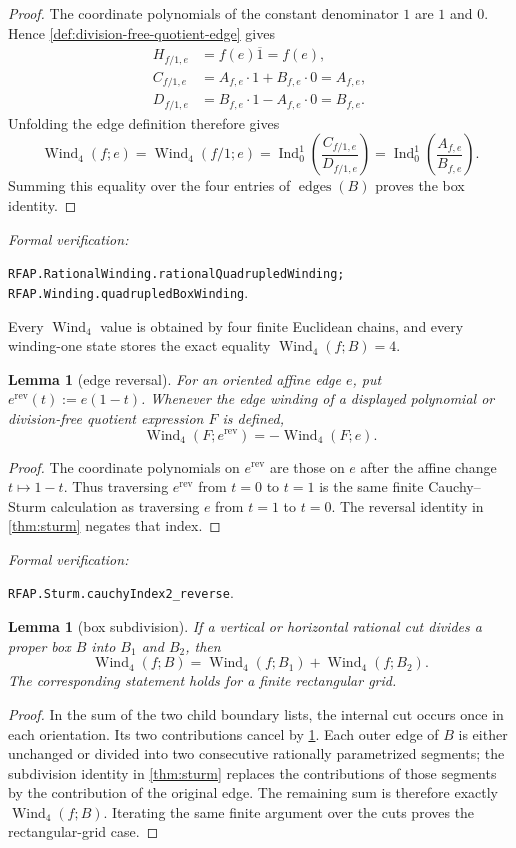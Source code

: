 \documentclass[11pt]{article}
\newtheorem{lemma}[theorem]{Lemma}
\newcommand{\Wind}{\operatorname{Wind}}
\newcommand{\Ind}{\operatorname{Ind}}
\newcommand{\leanref}[1]{\par\smallskip\noindent
  \emph{Formal verification:}\par\nobreak
  {\raggedright\nolinkurl{#1}.\par}}
\begin{document}
\begin{proof}
The coordinate polynomials of the constant denominator $1$ are $1$ and
$0$.  Hence \cref{def:division-free-quotient-edge} gives
\[
 \begin{aligned}
 H_{f/1,e}
   &=f(e)\overline{1}=f(e),\\
 C_{f/1,e}
   &=A_{f,e}\cdot1+B_{f,e}\cdot0=A_{f,e},\\
 D_{f/1,e}
   &=B_{f,e}\cdot1-A_{f,e}\cdot0=B_{f,e}.
 \end{aligned}
\]
Unfolding the edge definition therefore gives
\[
 \Wind_4(f;e)
   =\Wind_4(f/1;e)
   =\Ind_0^1\!\left(\frac{C_{f/1,e}}{D_{f/1,e}}\right)
   =\Ind_0^1\!\left(\frac{A_{f,e}}{B_{f,e}}\right).
\]
Summing this equality over the four entries of
$\operatorname{edges}(B)$ proves the box identity.
\end{proof}

\leanref{RFAP.RationalWinding.rationalQuadrupledWinding;
RFAP.Winding.quadrupledBoxWinding}

Every $\Wind_4$ value is obtained by four finite Euclidean chains, and every
winding-one state stores the exact equality $\Wind_4(f;B)=4$.

\begin{lemma}[edge reversal]
\label{lem:winding-edge-reversal}
For an oriented affine edge $e$, put $e^{\mathrm{rev}}(t):=e(1-t)$.
Whenever the edge winding of a displayed polynomial or division-free
quotient expression $F$ is defined,
\[
             \Wind_4(F;e^{\mathrm{rev}})=-\Wind_4(F;e).
\]
\end{lemma}

\begin{proof}
The coordinate polynomials on $e^{\mathrm{rev}}$ are those on $e$ after the
affine change $t\mapsto1-t$.  Thus traversing $e^{\mathrm{rev}}$ from
$t=0$ to $t=1$ is the same finite Cauchy--Sturm calculation as traversing
$e$ from $t=1$ to $t=0$.  The reversal identity in \cref{thm:sturm} negates
that index.
\end{proof}

\leanref{RFAP.Sturm.cauchyIndex2_reverse}

\begin{lemma}[box subdivision]
\label{lem:winding-add}
If a vertical or horizontal rational cut divides a proper box $B$ into
$B_1$ and $B_2$, then
\[
       \Wind_4(f;B)=\Wind_4(f;B_1)+\Wind_4(f;B_2).
\]
The corresponding statement holds for a finite rectangular grid.
\end{lemma}

\begin{proof}
In the sum of the two child boundary lists, the internal cut occurs once in
each orientation.  Its two contributions cancel by
\cref{lem:winding-edge-reversal}.  Each outer edge of $B$ is either unchanged
or divided into two consecutive rationally parametrized segments; the
subdivision identity in \cref{thm:sturm} replaces the contributions of those
segments by the contribution of the original edge.  The remaining sum is
therefore exactly $\Wind_4(f;B)$.  Iterating the same finite argument over
the cuts proves the rectangular-grid case.
\end{proof}
\end{document}
